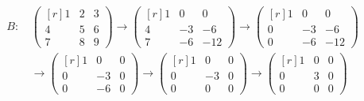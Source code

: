 \documentclass[a4paper,10pt,numbers=noenddot]{scrartcl}
\begin{document}
\begin{align*}
  B:
  &\,
  \begin{pmatrix*}[r]
    1 & 2 & 3 \\
    4 & 5 & 6 \\
    7 & 8 & 9
  \end{pmatrix*}
  \to
  \begin{pmatrix*}[r]
    1 &  0 &   0  \\
    4 & -3 &  -6  \\
    7 & -6 & -12
  \end{pmatrix*}
  \to
  \begin{pmatrix*}[r]
    1 &  0 &   0  \\
    0 & -3 &  -6  \\
    0 & -6 & -12
  \end{pmatrix*}
  \\
  &\,
  \to
  \begin{pmatrix*}[r]
    1 &  0 & 0  \\
    0 & -3 & 0  \\
    0 & -6 & 0
  \end{pmatrix*}
  \to
  \begin{pmatrix*}[r]
    1 &  0 & 0  \\
    0 & -3 & 0  \\
    0 &  0 & 0
  \end{pmatrix*}
  \to
  \begin{pmatrix*}[r]
    1 & 0 & 0 \\
    0 & 3 & 0 \\
    0 & 0 & 0
  \end{pmatrix*}
\end{align*}
\end{document}
